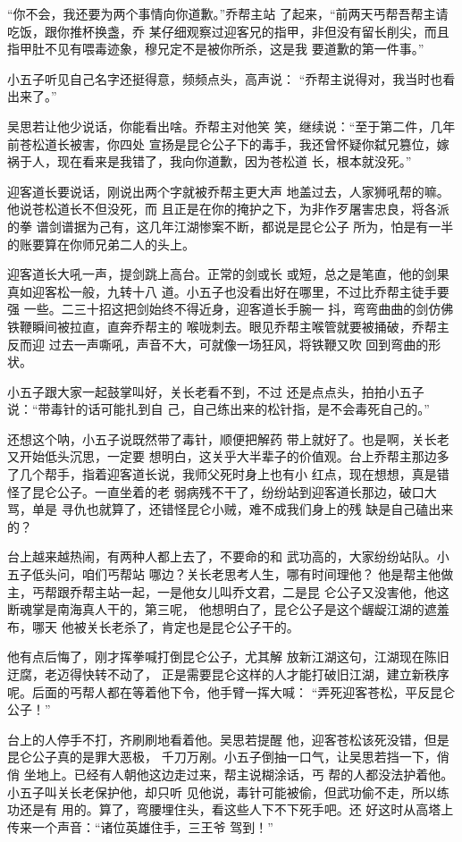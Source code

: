 “你不会，我还要为两个事情向你道歉。”乔帮主站
了起来，“前两天丐帮吾帮主请吃饭，跟你推杯换盏，乔
某仔细观察过迎客兄的指甲，非但没有留长削尖，而且
指甲肚不见有喂毒迹象，穆兄定不是被你所杀，这是我
要道歉的第一件事。”

小五子听见自己名字还挺得意，频频点头，高声说：
“乔帮主说得对，我当时也看出来了。”

吴思若让他少说话，你能看出啥。乔帮主对他笑
笑，继续说：“至于第二件，几年前苍松道长被害，你四处
宣扬是昆仑公子下的毒手，我还曾怀疑你弑兄篡位，嫁
祸于人，现在看来是我错了，我向你道歉，因为苍松道
长，根本就没死。”

迎客道长要说话，刚说出两个字就被乔帮主更大声
地盖过去，人家狮吼帮的嘛。他说苍松道长不但没死，而
且正是在你的掩护之下，为非作歹屠害忠良，将各派的拳
谱剑谱据为己有，这几年江湖惨案不断，都说是昆仑公子
所为，怕是有一半的账要算在你师兄弟二人的头上。

迎客道长大吼一声，提剑跳上高台。正常的剑或长
或短，总之是笔直，他的剑果真如迎客松一般，九转十八
道。小五子也没看出好在哪里，不过比乔帮主徒手要强
一些。二三十招这把剑始终不得近身，迎客道长手腕一
抖，弯弯曲曲的剑仿佛铁鞭瞬间被拉直，直奔乔帮主的
喉咙刺去。眼见乔帮主喉管就要被捅破，乔帮主反而迎
过去一声嘶吼，声音不大，可就像一场狂风，将铁鞭又吹
回到弯曲的形状。

小五子跟大家一起鼓掌叫好，关长老看不到，不过
还是点点头，拍拍小五子说：“带毒针的话可能扎到自
己，自己练出来的松针指，是不会毒死自己的。”

还想这个呐，小五子说既然带了毒针，顺便把解药
带上就好了。也是啊，关长老又开始低头沉思，一定要
想明白，这关乎大半辈子的价值观。台上乔帮主那边多
了几个帮手，指着迎客道长说，我师父死时身上也有小
红点，现在想想，真是错怪了昆仑公子。一直坐着的老
弱病残不干了，纷纷站到迎客道长那边，破口大骂，单是
寻仇也就算了，还错怪昆仑小贼，难不成我们身上的残
缺是自己磕出来的？

台上越来越热闹，有两种人都上去了，不要命的和
武功高的，大家纷纷站队。小五子低头问，咱们丐帮站
哪边？关长老思考人生，哪有时间理他？ 他是帮主他做
主，丐帮跟乔帮主站一起，一是他女儿叫乔文君，二是昆
仑公子又没害他，他这断魂掌是南海真人干的，第三呢，
他想明白了，昆仑公子是这个龌龊江湖的遮羞布，哪天
他被关长老杀了，肯定也是昆仑公子干的。

他有点后悔了，刚才挥拳喊打倒昆仑公子，尤其解
放新江湖这句，江湖现在陈旧迂腐，老迈得快转不动了，
正是需要昆仑这样的人才能打破旧江湖，建立新秩序
呢。后面的丐帮人都在等着他下令，他手臂一挥大喊：
“弄死迎客苍松，平反昆仑公子！”

台上的人停手不打，齐刷刷地看着他。吴思若提醒
他，迎客苍松该死没错，但是昆仑公子真的是罪大恶极，
千刀万剐。小五子倒抽一口气，让吴思若挡一下，俏俏
坐地上。已经有人朝他这边走过来，帮主说糊涂话，丐
帮的人都没法护着他。小五子叫关长老保护他，却只听
见他说，毒针可能被偷，但武功偷不走，所以练功还是有
用的。算了，弯腰埋住头，看这些人下不下死手吧。还
好这时从高塔上传来一个声音：“诸位英雄住手，三王爷
驾到！”
\newline

